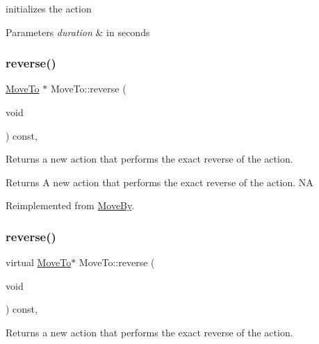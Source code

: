 initializes the action 
\begin{DoxyParams}{Parameters}
{\em duration} & in seconds \\
\hline
\end{DoxyParams}
\mbox{\label{classMoveTo_afb568e581e69aad40f815e48eb13cb54}} 
\subsubsection{\texorpdfstring{reverse()}{reverse()}\hspace{0.1cm}{\footnotesize\ttfamily [1/2]}}
{\footnotesize\ttfamily \hyperlink{classMoveTo}{Move\+To} $\ast$ Move\+To\+::reverse (\begin{DoxyParamCaption}\item[{void}]{ }\end{DoxyParamCaption}) const\hspace{0.3cm}{\ttfamily [override]}, {\ttfamily [virtual]}}

Returns a new action that performs the exact reverse of the action.

\begin{DoxyReturn}{Returns}
A new action that performs the exact reverse of the action.  NA 
\end{DoxyReturn}


Reimplemented from \hyperlink{classMoveBy_a3a29609f88b72d383c31e122693185f7}{Move\+By}.

\mbox{\label{classMoveTo_a6113c5521a72f5e4a8ce56df5ab50722}} 
\subsubsection{\texorpdfstring{reverse()}{reverse()}\hspace{0.1cm}{\footnotesize\ttfamily [2/2]}}
{\footnotesize\ttfamily virtual \hyperlink{classMoveTo}{Move\+To}$\ast$ Move\+To\+::reverse (\begin{DoxyParamCaption}\item[{void}]{ }\end{DoxyParamCaption}) const\hspace{0.3cm}{\ttfamily [override]}, {\ttfamily [virtual]}}

Returns a new action that performs the exact reverse of the action.

